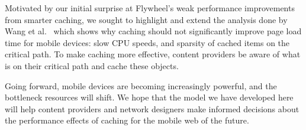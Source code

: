 
Motivated by our initial surprise at Flywheel's weak performance improvements
from smarter caching, we sought to highlight and extend the analysis done by
Wang et al.~\cite{wang2013demystifying} which shows why caching should not
significantly improve page load time for mobile devices: slow CPU
speeds, and sparsity of cached items on the critical
path.
To make caching more effective, content providers be aware of what is on their critical path and cache these objects. 


Going forward, mobile devices are becoming increasingly powerful, and the
bottleneck resources will shift. We hope that the model we have developed here
will help content providers and network designers make informed decisions about the performance
effects of caching for the mobile web of the future.


